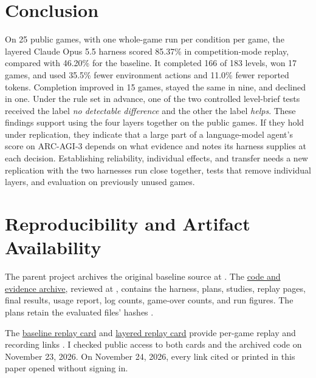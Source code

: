 \section{Conclusion}\label{sec:conclusion}
On 25 public games, with one whole-game run per condition per game, the layered Claude Opus 5.5 harness scored 85.37\% in competition-mode replay, compared with 46.20\% for the baseline. It completed 166 of 183 levels, won 17 games, and used 35.5\% fewer environment actions and 11.0\% fewer reported tokens. Completion improved in 15 games, stayed the same in nine, and declined in one. Under the rule set in advance, one of the two controlled level-brief tests received the label \emph{no detectable difference} and the other the label \emph{helps}. These findings support using the four layers together on the public games. If they hold under replication, they indicate that a large part of a language-model agent's score on ARC-AGI-3 depends on what evidence and notes its harness supplies at each decision. Establishing reliability, individual effects, and transfer needs a new replication with the two harnesses run close together, tests that remove individual layers, and evaluation on previously unused games.

\section*{Reproducibility and Artifact Availability}
The parent project archives the original baseline source at . The \href{https://github.com/dcw06/ARC-AGI-3-Opus-5.5-Harness/tree/17d00cfdef7944dda9fd9388efa49fccce4877aa}{code and evidence archive}, reviewed at , contains the harness, plans, studies, replay pages, final results, usage report, log counts, game-over counts, and run figures. The plans retain the evaluated files' hashes \citep{dai2026code,dai2026harnessexport}.

The \href{https://arcprize.org/scorecards/0f882c2e-0451-41bd-86c5-211a54785c56}{baseline replay card} and \href{https://arcprize.org/scorecards/96932ddf-ab6a-4354-94b2-9644447dae14}{layered replay card} provide per-game replay and recording links \citep{dai2026baselinefinalcard,dai2026finalmanifest}. I checked public access to both cards and the archived code on November 23, 2026. On November 24, 2026, every link cited or printed in this paper opened without signing in.

